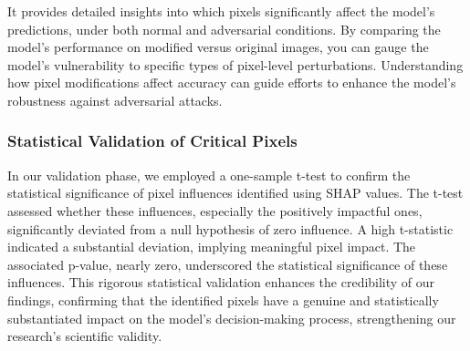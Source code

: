 \documentclass[10pt, conference, a4paper, final]{IEEEtran}
\begin{document}
It provides detailed insights into which pixels significantly affect the model's predictions, under both normal and adversarial conditions. By comparing the model's performance on modified versus original images, you can gauge the model's vulnerability to specific types of pixel-level perturbations. Understanding how pixel modifications affect accuracy can guide efforts to enhance the model's robustness against adversarial attacks.

    
\subsubsection{Statistical Validation of Critical Pixels}


In our validation phase, we employed a one-sample t-test to confirm the statistical significance of pixel influences identified using SHAP values. The t-test assessed whether these influences, especially the positively impactful ones, significantly deviated from a null hypothesis of zero influence. A high t-statistic indicated a substantial deviation, implying meaningful pixel impact. The associated p-value, nearly zero, underscored the statistical significance of these influences. This rigorous statistical validation enhances the credibility of our findings, confirming that the identified pixels have a genuine and statistically substantiated impact on the model's decision-making process, strengthening our research's scientific validity.
\end{document}
